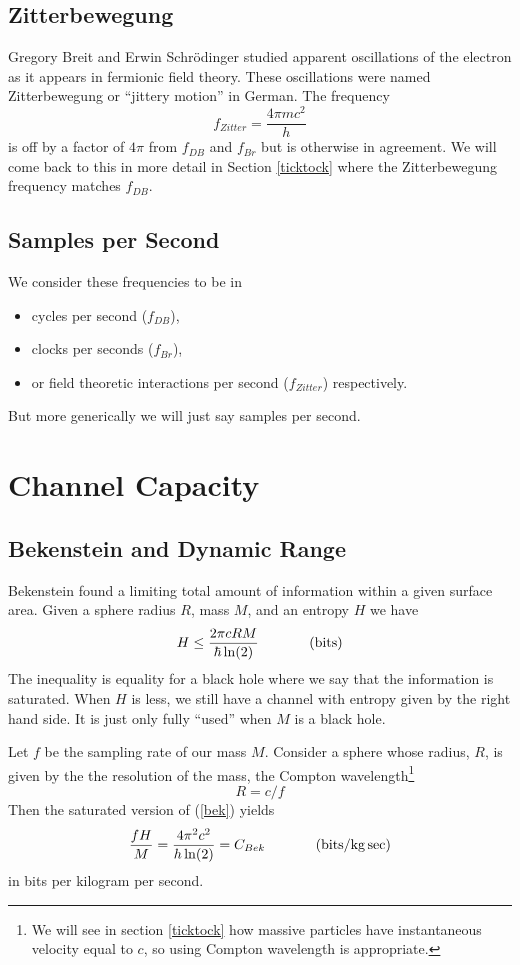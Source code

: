 \documentclass[12pt,a4paper]{article}
\begin{document}
\subsection{Zitterbewegung}
Gregory Breit and Erwin Schrödinger studied apparent oscillations of the electron as it appears in fermionic field theory.  These oscillations were named Zitterbewegung or ``jittery motion'' in German.  The frequency 
\[
 f_{Zitter} = \frac{4 \pi mc^2}{h}
 \]
is off by a factor of $4 \pi$ from $f_{DB}$ and $f_{Br}$ but is otherwise in agreement.  We will come back to this in more detail in Section \ref{ticktock} where the Zitterbewegung frequency matches $f_{DB}$.

\subsection{Samples per Second}
We consider these frequencies to be in
\begin{itemize}
 \item cycles per second ($f_{DB}$),
 \item clocks per seconds ($f_{Br}$),
 \item or field theoretic interactions per second ($f_{Zitter}$) respectively.
\end{itemize}
But more generically we will just say samples per second. 

\section{Channel Capacity}
\subsection{Bekenstein and Dynamic Range}
Bekenstein found a limiting total amount of information within a given surface area.  Given a sphere radius $R$,  mass $M$, and an entropy $H$ we have
\begin{equation}
\label{bek}
  H \le \frac{2 \pi c R M}{\hbar \ln(2)} \hspace{0.5 in} (\si[per-mode=symbol]{bits})
\end{equation}
The inequality is equality for a black hole where we say that the information is saturated.  When $H$ is less, we still have a channel with entropy given by the right hand side.  It is just only fully ``used'' when $M$ is a black hole.

Let $f$ be the sampling rate of our mass $M$.  Consider a sphere whose radius, $R$, is given by the  the resolution of the mass, the Compton wavelength\footnote{We will see in section \ref{ticktock} how massive particles have instantaneous velocity equal to $c$, so using Compton wavelength is appropriate.}
\[
  R=c/f  
\]
Then the saturated version of (\ref{bek}) yields
\[
 \frac{fH}{M} = \frac{4 \pi^2 c^2}{h \ln(2)} = C_{Bek} \hspace{0.5 in} (\si[per-mode=symbol]{bits\per\kilogram.\sec})
\]
in bits per kilogram per second.
\end{document}
